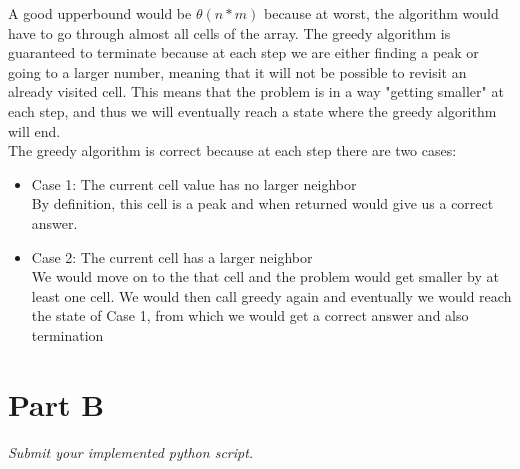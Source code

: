 \documentclass[12pt,twoside]{article}
\begin{document}
\begin{problems}
\begin{problemparts}
\begin{verbatim}
\end{verbatim}
\problempart 
A good upperbound would be $\theta(n*m)$ because at worst, the algorithm would have to go through almost all cells of the array.
\problempart
The greedy algorithm is guaranteed to terminate because at each step we are either finding a peak or going to a larger number, meaning that it will not be possible to revisit an already visited cell. This means that the problem is in a way "getting smaller" at each step, and thus we will eventually reach a state where the greedy algorithm will end.\\
The greedy algorithm is correct because at each step there are two cases:\\
\begin{itemize}
\item Case 1: The current cell value has no larger neighbor\\
By definition, this cell is a peak and when returned would give us a correct answer.\\
\item Case 2: The current cell has a larger neighbor\\
We would move on to the that cell and the problem would get smaller by at least one cell. We would then call greedy again and eventually we would reach the state of Case 1, from which we would get a correct answer and also termination
\end{itemize}
\end{problemparts}

\section*{Part B}

\emph{Submit your implemented python script.}

\end{problems}
\end{document}
